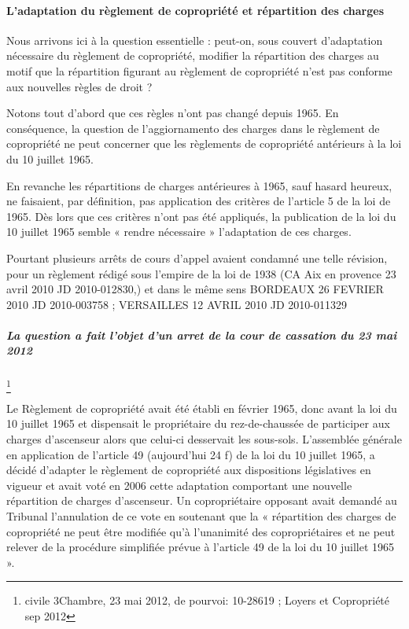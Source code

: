 			\paragraph{L’adaptation du règlement de copropriété et répartition des charges}
			
				Nous arrivons ici à la question essentielle : peut-on, sous couvert d’adaptation nécessaire du règlement de copropriété, modifier la répartition des charges au motif que la répartition figurant au règlement de copropriété n’est pas conforme aux nouvelles règles de droit ?
				
				Notons tout d’abord que ces règles n’ont pas changé depuis 1965. En conséquence, la question de l’aggiornamento des charges dans le règlement de copropriété ne peut concerner que les règlements de copropriété antérieurs à la loi du 10 juillet 1965.
				
				En revanche les répartitions de charges antérieures à 1965, sauf hasard heureux, ne faisaient, par définition, pas application des critères de l’article 5 de la loi de 1965. Dès lors que ces critères n’ont pas été appliqués, la publication de la loi du 10 juillet 1965 semble « rendre nécessaire » l’adaptation de ces charges.
				
				Pourtant plusieurs arrêts de cours d’appel avaient condamné une telle révision, pour un règlement rédigé sous l’empire de la loi de 1938 (CA Aix en provence 23 avril 2010 JD 2010-012830,) et dans le même sens BORDEAUX 26 FEVRIER 2010 JD 2010-003758 ; VERSAILLES 12 AVRIL 2010 JD 2010-011329

				\subparagraph{La question a fait l’objet d’un arret de la cour de cassation du 23 mai 2012}\footnote{civile 3\degres Chambre, 23 mai 2012, \no de pourvoi: 10-28619 ; Loyers et Copropriété sep 2012 }
			
				Le Règlement de copropriété avait été établi en février 1965, donc avant la loi du 10 juillet 1965 et dispensait le propriétaire du rez-de-chaussée de participer aux charges d’ascenseur alors que celui-ci desservait les sous-sols. L’assemblée générale en application de l'article 49 (aujourd’hui 24 f) de la loi du 10 juillet 1965, a décidé d'adapter le règlement de copropriété aux dispositions législatives en vigueur et avait voté en 2006 cette adaptation comportant une nouvelle répartition de charges d’ascenseur. Un copropriétaire opposant avait demandé au Tribunal l’annulation de ce vote en soutenant que la « répartition des charges de copropriété ne peut être modifiée qu'à l'unanimité des copropriétaires et ne peut relever de la procédure simplifiée prévue à l'article 49 de la loi du 10 juillet 1965 ».
				
